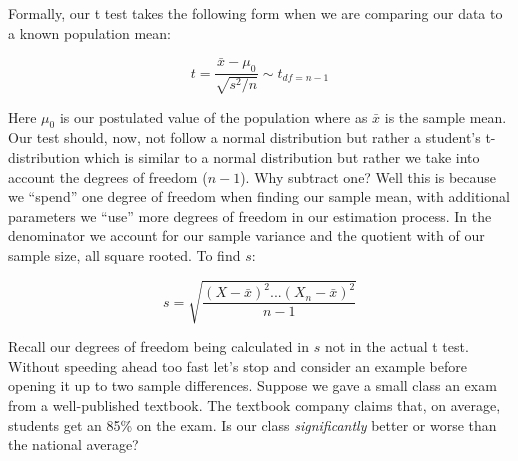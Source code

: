 \documentclass[12pt]{article}\usepackage[]{graphicx}\usepackage[]{color}
\begin{document}
\begin{flushleft}
Formally, our t test takes the following form when we are comparing our data to a known population mean:

$$ t = \frac{\bar{x} - \mu_0}{\sqrt{s^2 / n}} \sim t_{df=n-1} $$

Here $\mu_0$ is our postulated value of the population where as $\bar{x}$ is the sample mean. Our test should, now, not follow a normal distribution but rather a student's t-distribution which is similar to a normal distribution but rather we take into account the degrees of freedom ($n-1$). Why subtract one? Well this is because we ``spend'' one degree of freedom when finding our sample mean, with additional parameters we ``use'' more degrees of freedom in our estimation process. In the denominator we account for our sample variance and the quotient with of our sample size, all square rooted. To find $s$:

$$s = \sqrt{\frac{(X-\bar{x})^2 \text{...} (X_n - \bar{x})^2 }{n-1} } $$

Recall our degrees of freedom being calculated in $s$ not in the actual t test. Without speeding ahead too fast let's stop and consider an example before opening it up to two sample differences. Suppose we gave a small class an exam from a well-published textbook. The textbook company claims that, on average, students get an 85\% on the exam. Is our class \textit{significantly} better or worse than the national average?


\end{flushleft}
\end{document}
